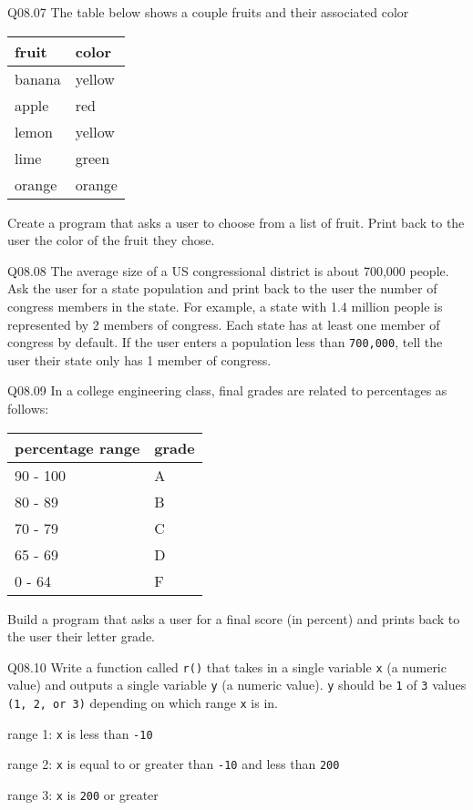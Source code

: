 \documentclass{book}
\newenvironment{problems}{}{}  %
\newcommand{\passthrough}[1]{#1}
\begin{document}
\begin{problems}
Q08.07 The table below shows a couple fruits and their associated color

\begin{longtable}[]{@{}ll@{}}
\toprule
fruit & color\tabularnewline
\midrule
\endhead
banana & yellow\tabularnewline
apple & red\tabularnewline
lemon & yellow\tabularnewline
lime & green\tabularnewline
orange & orange\tabularnewline
\bottomrule
\end{longtable}

Create a program that asks a user to choose from a list of fruit. Print
back to the user the color of the fruit they chose.

Q08.08 The average size of a US congressional district is about 700,000
people. Ask the user for a state population and print back to the user
the number of congress members in the state. For example, a state with
1.4 million people is represented by 2 members of congress. Each state
has at least one member of congress by default. If the user enters a
population less than \passthrough{\lstinline!700,000!}, tell the user
their state only has 1 member of congress.

Q08.09 In a college engineering class, final grades are related to
percentages as follows:

\begin{longtable}[]{@{}ll@{}}
\toprule
percentage range & grade\tabularnewline
\midrule
\endhead
90 - 100 & A\tabularnewline
80 - 89 & B\tabularnewline
70 - 79 & C\tabularnewline
65 - 69 & D\tabularnewline
0 - 64 & F\tabularnewline
\bottomrule
\end{longtable}

Build a program that asks a user for a final score (in percent) and
prints back to the user their letter grade.

Q08.10 Write a function called \passthrough{\lstinline!r()!} that takes
in a single variable \passthrough{\lstinline!x!} (a numeric value) and
outputs a single variable \passthrough{\lstinline!y!} (a numeric value).
\passthrough{\lstinline!y!} should be \passthrough{\lstinline!1!} of
\passthrough{\lstinline!3!} values
\passthrough{\lstinline!(1, 2, or 3)!} depending on which range
\passthrough{\lstinline!x!} is in.

range 1: \passthrough{\lstinline!x!} is less than
\passthrough{\lstinline!-10!}

range 2: \passthrough{\lstinline!x!} is equal to or greater than
\passthrough{\lstinline!-10!} and less than
\passthrough{\lstinline!200!}

range 3: \passthrough{\lstinline!x!} is \passthrough{\lstinline!200!} or
greater
        \end{problems}
\end{document}

